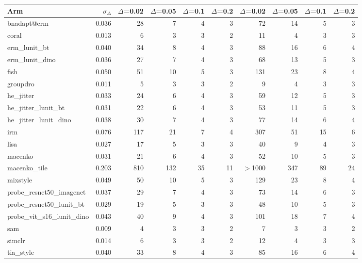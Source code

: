 \begin{tabular}{lrrrrrrrrr}
\toprule
Arm & $\sigma_\Delta$ & $\Delta$=0.02 & $\Delta$=0.05 & $\Delta$=0.1 & $\Delta$=0.2 & $\Delta$=0.02 & $\Delta$=0.05 & $\Delta$=0.1 & $\Delta$=0.2 \\
\midrule
bnadapt@erm & 0.036 & 28 & 7 & 4 & 3 & 72 & 14 & 5 & 3 \\
coral & 0.013 & 6 & 3 & 3 & 2 & 11 & 4 & 3 & 3 \\
erm\_lunit\_bt & 0.040 & 34 & 8 & 4 & 3 & 88 & 16 & 6 & 4 \\
erm\_lunit\_dino & 0.036 & 27 & 7 & 4 & 3 & 68 & 13 & 5 & 3 \\
fish & 0.050 & 51 & 10 & 5 & 3 & 131 & 23 & 8 & 4 \\
groupdro & 0.011 & 5 & 3 & 3 & 2 & 9 & 4 & 3 & 3 \\
he\_jitter & 0.033 & 24 & 6 & 4 & 3 & 59 & 12 & 5 & 3 \\
he\_jitter\_lunit\_bt & 0.031 & 22 & 6 & 4 & 3 & 53 & 11 & 5 & 3 \\
he\_jitter\_lunit\_dino & 0.038 & 30 & 7 & 4 & 3 & 77 & 14 & 6 & 4 \\
irm & 0.076 & 117 & 21 & 7 & 4 & 307 & 51 & 15 & 6 \\
lisa & 0.027 & 17 & 5 & 3 & 3 & 40 & 9 & 4 & 3 \\
macenko & 0.031 & 21 & 6 & 4 & 3 & 52 & 10 & 5 & 3 \\
macenko\_tile & 0.203 & 810 & 132 & 35 & 11 & $>$1000 & 347 & 89 & 24 \\
mixstyle & 0.049 & 50 & 10 & 5 & 3 & 129 & 23 & 8 & 4 \\
probe\_resnet50\_imagenet & 0.037 & 29 & 7 & 4 & 3 & 73 & 14 & 6 & 3 \\
probe\_resnet50\_lunit\_bt & 0.029 & 19 & 5 & 3 & 3 & 48 & 10 & 5 & 3 \\
probe\_vit\_s16\_lunit\_dino & 0.043 & 40 & 9 & 4 & 3 & 101 & 18 & 7 & 4 \\
sam & 0.009 & 4 & 3 & 3 & 2 & 7 & 3 & 3 & 2 \\
simclr & 0.014 & 6 & 3 & 3 & 2 & 12 & 4 & 3 & 3 \\
tia\_style & 0.040 & 33 & 8 & 4 & 3 & 85 & 16 & 6 & 4 \\
\bottomrule
\end{tabular}
